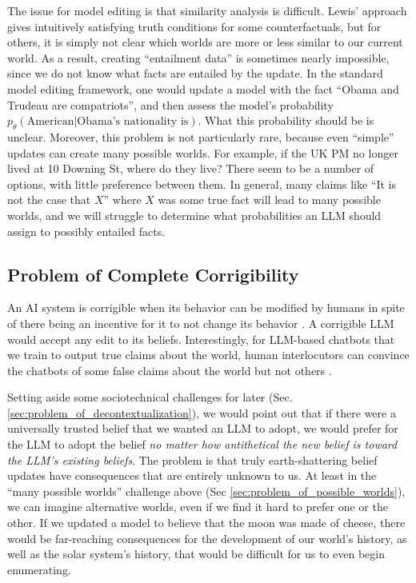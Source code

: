 \documentclass[11pt,a4paper]{article}
\begin{document}
The issue for model editing is that similarity analysis is difficult. Lewis' approach gives intuitively satisfying truth conditions for some counterfactuals, but for others, it is simply not clear which worlds are more or less similar to our current world. As a result, creating ``entailment data'' \citep{hase2021language} is sometimes nearly impossible, since we do not know what facts are entailed by the update. In the standard model editing framework, one would update a model with the fact ``Obama and Trudeau are compatriots'', and then assess the model's probability $p_\theta(\textrm{American}|\textrm{Obama's nationality is})$. What this probability should be is unclear. 
Moreover, this problem is not particularly rare, because even ``simple'' updates can create many possible worlds. For example, if the UK PM no longer lived at 10 Downing St, where do they live? There seem to be a number of options, with little preference between them. In general, many claims like ``It is not the case that $X$'' where $X$ was some true fact will lead to many possible worlds, and we will struggle to determine what probabilities an LLM should assign to possibly entailed facts. 

\subsection{Problem of Complete Corrigibility}
\label{sec:problem_of_complete_corrigibility}

An AI system is corrigible when its behavior can be modified by humans in spite of there being an incentive for it to not change its behavior \citep{soares2015corrigibility}. A corrigible LLM would accept any edit to its beliefs. Interestingly, for LLM-based chatbots that we train to output true claims about the world, human interlocutors can convince the chatbots of some false claims about the world but not others \citep{xu2023earth}.

Setting aside some sociotechnical challenges for later (Sec. \ref{sec:problem_of_decontextualization}), we would point out that if there were a universally trusted belief that we wanted an LLM to adopt, we would prefer for the LLM to adopt the belief \emph{no matter how antithetical the new belief is toward the LLM's existing beliefs}. The problem is that truly earth-shattering belief updates have consequences that are entirely unknown to us. At least in the ``many possible worlds'' challenge above (Sec \ref{sec:problem_of_possible_worlds}), we can imagine alternative worlds, even if we find it hard to prefer one or the other. 
If we updated a model to believe that the moon was made of cheese, there would be far-reaching consequences for the development of our world's history, as well as the solar system's history, that would be difficult for us to even begin enumerating.
\end{document}
